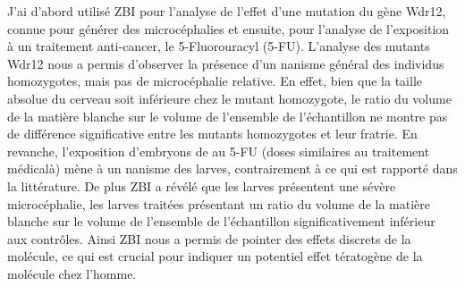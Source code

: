 \documentclass[\main/main.tex]{subfiles}
\begin{document}
%
J'ai d'abord utilisé ZBI pour l'analyse de l'effet d'une mutation du gène Wdr12,
connue pour générer des microcéphalies et ensuite, pour l'analyse de l'exposition à un traitement anti-cancer,
le 5-Fluorouracyl (5-FU).
%
L'analyse des mutants Wdr12 nous a permis d'observer la présence
d'un nanisme général des individus homozygotes, mais pas de microcéphalie relative.
%
En effet, bien que la taille absolue du cerveau soit inférieure chez le mutant homozygote, 
le ratio du volume de la matière blanche sur le volume de l'ensemble de l'échantillon ne montre pas de différence significative entre les mutants homozygotes et leur fratrie.
%
En revanche, l'exposition d'embryons de \pz{} au 5-FU (doses similaires au traitement médicalà) mène à un nanisme des larves,
contrairement à ce qui est rapporté dans la littérature. De plus ZBI a révélé que les larves présentent une sévère microcéphalie, les larves traitées présentant un ratio du volume de la matière blanche sur le volume de l'ensemble de l'échantillon significativement inférieur aux contrôles. Ainsi ZBI nous a permis de pointer des effets discrets de la molécule, ce qui est crucial pour indiquer un potentiel effet tératogène de la molécule chez l'homme.
\end{document}
